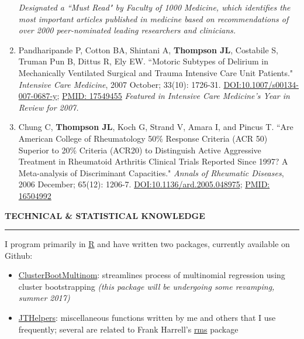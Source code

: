 \documentclass[5pt]{article}
\begin{document}
\begin{enumerate}
    \emph{Designated a ``Must Read" by Faculty of 1000 Medicine, which identifies the most important articles published in medicine based on recommendations of over 2000 peer-nominated leading researchers and clinicians.}
\item Pandharipande P, Cotton BA, Shintani A, \textbf{Thompson JL}, Costabile S, Truman Pun B, Dittus R, Ely EW. ``Motoric Subtypes of Delirium in Mechanically Ventilated Surgical and Trauma Intensive Care Unit Patients." \emph{Intensive Care Medicine}, 2007 October; 33(10): 1726-31. \href{https://doi.org/10.1007/s00134-007-0687-y}{DOI:10.1007/s00134-007-0687-y}; \href{https://www.ncbi.nlm.nih.gov/pubmed/17549455}{PMID: 17549455} \emph{Featured in Intensive Care Medicine's Year in Review for 2007.}
\item Chung C, \textbf{Thompson JL}, Koch G, Strand V, Amara I, and Pincus T. ``Are American College of Rheumatology 50\% Response Criteria (ACR 50) Superior to 20\% Criteria (ACR20) to Distinguish Active Aggressive Treatment in Rheumatoid Arthritis Clinical Trials Reported Since 1997? A Meta-analysis of Discriminant Capacities." \emph{Annals of Rheumatic Diseases}, 2006 December; 65(12): 1206-7. \href{https://doi.org/10.1136/ard.2005.048975}{DOI:10.1136/ard.2005.048975}; \href{https://www.ncbi.nlm.nih.gov/pubmed/16504992}{PMID: 16504992}
\end{enumerate}

\noindent \linebreak \textbf{TECHNICAL \& STATISTICAL KNOWLEDGE}\\
\rule[5pt]{\linewidth}{1.0pt}
\noindent I program primarily in \href{http://www.r-project.org}{R} and have written two packages, currently available on Github:
\begin{itemize}
\item \href{https://github.com/jenniferthompson/ClusterBootMultinom}{ClusterBootMultinom}: streamlines process of multinomial regression using cluster bootstrapping \emph{(this package will be undergoing some revamping, summer 2017)}
\item \href{https://github.com/jenniferthompson/JTHelpers}{JTHelpers}: miscellaneous functions written by me and others that I use frequently; several are related to Frank Harrell's \href{https://cran.r-project.org/web/packages/rms/index.html}{rms} package
\end{itemize}
\end{document}
